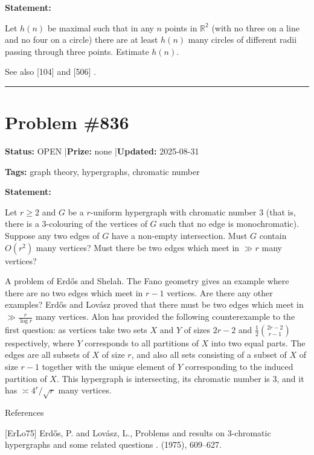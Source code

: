 \documentclass{article}
\begin{document}
\noindent\textbf{Statement:}

Let $h(n)$ be maximal such that in any $n$ points in $\mathbb{R}^2$ (with no three on a line and no four on a circle) there are at least $h(n)$ many circles of different radii passing through three points. Estimate $h(n)$.




See also [104] and [506] .

\noindent\rule{\linewidth}{0.4pt}


\section{Problem \#836}
\label{prob:836}

\noindent\textbf{Status:} OPEN \quad|\quad \textbf{Prize:} none \quad|\quad \textbf{Updated:} 2025-08-31

\noindent\textbf{Tags:} graph theory, hypergraphs, chromatic number

\medskip

\noindent\textbf{Statement:}

Let $r\geq 2$ and $G$ be a $r$-uniform hypergraph with chromatic number $3$ (that is, there is a $3$-colouring of the vertices of $G$ such that no edge is monochromatic). Suppose any two edges of $G$ have a non-empty intersection. Must $G$ contain $O(r^2)$ many vertices? Must there be two edges which meet in $\gg r$ many vertices?




A problem of Erd\H{o}s and Shelah. The Fano geometry gives an example where there are no two edges which meet in $r-1$ vertices. Are there any other examples? Erd\H{o}s and Lov\'{a}sz \cite{ErLo75} proved that there must be two edges which meet in $\gg \frac{r}{\log r}$ many vertices. Alon has provided the following counterexample to the first question: as vertices take two sets $X$ and $Y$ of sizes $2r-2$ and $\frac{1}{2}\binom{2r-2}{r-1}$ respectively, where $Y$ corresponds to all partitions of $X$ into two equal parts. The edges are all subsets of $X$ of size $r$, and also all sets consisting of a subset of $X$ of size $r-1$ together with the unique element of $Y$ corresponding to the induced partition of $X$. This hypergraph is intersecting, its chromatic number is $3$, and it has $\asymp 4^r/\sqrt{r}$ many vertices.




References

[ErLo75] Erd\H{o}s, P. and Lov\'{a}sz, L., Problems and results on {$3$}-chromatic hypergraphs and some related questions . (1975), 609--627.
\end{document}
